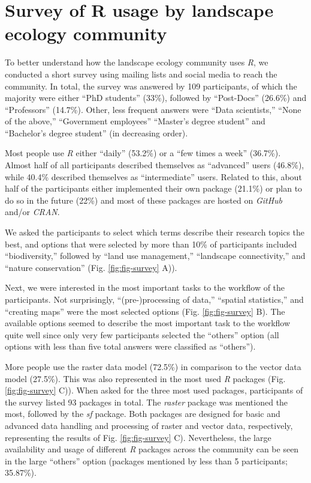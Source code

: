 \documentclass[smallextended]{svjour3}       %
\begin{document}
\hypertarget{survey-of-r-usage-by-landscape-ecology-community}{%
\section{Survey of R usage by landscape ecology community}\label{survey-of-r-usage-by-landscape-ecology-community}}

To better understand how the landscape ecology community uses \emph{R}, we conducted a short survey using mailing lists and social media to reach the community.
In total, the survey was answered by 109 participants, of which the majority were either ``PhD students'' (33\%), followed by ``Post-Docs'' (26.6\%) and ``Professors'' (14.7\%).
Other, less frequent answers were ``Data scientists,'' ``None of the above,'' ``Government employees'' ``Master's degree student'' and ``Bachelor's degree student'' (in decreasing order).

Most people use \emph{R} either ``daily'' (53.2\%) or a ``few times a week'' (36.7\%).
Almost half of all participants described themselves as ``advanced'' users (46.8\%), while 40.4\% described themselves as ``intermediate'' users.
Related to this, about half of the participants either implemented their own package (21.1\%) or plan to do so in the future (22\%) and most of these packages are hosted on \emph{GitHub} and/or \emph{CRAN}.

We asked the participants to select which terms describe their research topics the best, and options that were selected by more than 10\% of participants included ``biodiversity,'' followed by ``land use management,'' ``landscape connectivity,'' and ``nature conservation'' (Fig. \ref{fig:fig-survey} A)).

Next, we were interested in the most important tasks to the workflow of the participants.
Not surprisingly, ``(pre-)processing of data,'' ``spatial statistics,'' and ``creating maps'' were the most selected options (Fig. \ref{fig:fig-survey} B).
The available options seemed to describe the most important task to the workflow quite well since only very few participants selected the ``others'' option (all options with less than five total answers were classified as ``others'').

More people use the raster data model (72.5\%) in comparison to the vector data model (27.5\%).
This was also represented in the most used \emph{R} packages (Fig. \ref{fig:fig-survey} C)).
When asked for the three most used packages, participants of the survey listed 93 packages in total.
The \emph{raster} package was mentioned the most, followed by the \emph{sf} package.
Both packages are designed for basic and advanced data handling and processing of raster and vector data, respectively, representing the results of Fig. \ref{fig:fig-survey} C).
Nevertheless, the large availability and usage of different \emph{R} packages across the community can be seen in the large ``others'' option (packages mentioned by less than 5 participants; 35.87\%).
\end{document}
